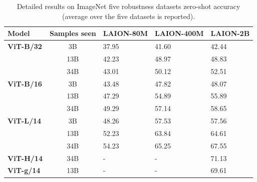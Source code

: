 \begin{appendix}
\begin{table}[tb]
\small
\centering
{}
\small
\begin{tabular}{@{}lclll@{}}
\toprule
\textbf{Model}                     & \textbf{Samples seen} & \textbf{LAION-80M} & \textbf{LAION-400M} & \textbf{LAION-2B} \\ \midrule
\textbf{ViT-B/32} & 3B           & 37.95     & 41.60      & 42.44       \\
                          & 13B          & 42.23     & 48.97       & 48.83       \\
                          & 34B          & 43.01         & 50.12      &52.51        \\ \midrule
\textbf{ViT-B/16} & 3B           & 43.48     & 47.82      & 48.07       \\
                          & 13B          & 47.29     & 54.89       & 55.89       \\
                          & 34B          & 49.29         & 57.14      & 58.65        \\ \midrule                          
\textbf{ViT-L/14} & 3B           & 48.26     & 57.53      & 57.56       \\         
& 13B          & 52.23         & 63.84      & 64.61           \\
                          & 34B          & 54.23         & 65.25       & 67.55       \\ \midrule 
\textbf{ViT-H/14} & 34B           & -     & -      & 71.13       \\         \midrule 
\textbf{ViT-g/14} & 13B           & -     & -      & 69.61       \\         \bottomrule 

\end{tabular}
\caption{Detailed results on ImageNet five robustness datasets zero-shot accuracy (average over the five datasets is reported).
}
\label{table:zeroshot_imrobustness}
\end{table}



\begin{table}[tb]


\end{table}
\end{appendix}

